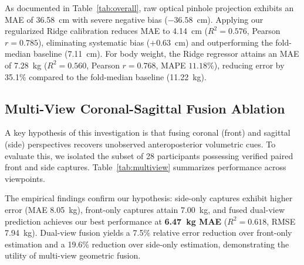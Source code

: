 \documentclass[conference]{IEEEtran}
\begin{document}
As documented in Table~\ref{tab:overall}, raw optical pinhole projection exhibits an MAE of 36.58~cm with severe negative bias ($-36.58$~cm). Applying our regularized Ridge calibration reduces MAE to 4.14~cm ($R^2=0.576$, Pearson $r=0.785$), eliminating systematic bias ($+0.63$~cm) and outperforming the fold-median baseline (7.11~cm). For body weight, the Ridge regressor attains an MAE of 7.28~kg ($R^2=0.560$, Pearson $r=0.768$, MAPE $11.18\%$), reducing error by 35.1\% compared to the fold-median baseline (11.22~kg).

\subsection{Multi-View Coronal-Sagittal Fusion Ablation}
A key hypothesis of this investigation is that fusing coronal (front) and sagittal (side) perspectives recovers unobserved anteroposterior volumetric cues. To evaluate this, we isolated the subset of 28 participants possessing verified paired front and side captures. Table~\ref{tab:multiview} summarizes performance across viewpoints.

\begin{table}[t]
\caption{Viewpoint Ablation and Coronal-Sagittal Fusion ($N=28$ Groups)}
\label{tab:multiview}
\centering
{}
\end{table}

The empirical findings confirm our hypothesis: side-only captures exhibit higher error (MAE 8.05~kg), front-only captures attain 7.00~kg, and fused dual-view prediction achieves our best performance at \textbf{6.47~kg MAE} ($R^2 = 0.618$, RMSE 7.94~kg). Dual-view fusion yields a 7.5\% relative error reduction over front-only estimation and a 19.6\% reduction over side-only estimation, demonstrating the utility of multi-view geometric fusion.
\end{document}

